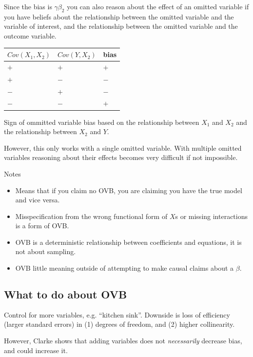 \documentclass{tufte-handout}
\begin{document}
Since the bias is \(\gamma \beta_2\) you can also reason about the
effect of an omitted variable if you have beliefs about the relationship
between the omitted variable and the variable of interest, and the
relationship between the omitted variable and the outcome variable.

\begin{marginfigure}
\begin{tabular}{lll}
 $Cov(X_1, X_2)$ & $Cov(Y, X_2)$ & bias \\
\hline
 $+$      & $+$       & $+$  \\
 $+$      & $-$       & $-$  \\
 $-$      & $+$       & $-$  \\
 $-$      & $-$       & $+$  
\end{tabular}
\caption{Sign of ommitted variable bias based on the relationship
between $X_1$ and $X_2$ and the relationship between $X_2$ and $Y$.}
\end{marginfigure}

However, this only works with a single omitted variable. With multiple
omitted variables reasoning about their effects becomes very difficult
if not impossible.

Notes

\begin{itemize}
\itemsep1pt\parskip0pt
\item
  Means that if you claim no OVB, you are claiming you have the true
  model and vice versa.
\item
  Misspecification from the wrong functional form of \(X\)s or missing
  interactions is a form of OVB.
\item
  OVB is a deterministic relationship between coefficients and
  equations, it is not about sampling.
\item
  OVB little meaning outside of attempting to make causal claims about a
  \(\beta\).
\end{itemize}

\subsection{What to do about OVB}\label{what-to-do-about-ovb}

Control for more variables, e.g. ``kitchen sink''. Downside is loss of
efficiency (larger standard errors) in (1) degrees of freedom, and (2)
higher collinearity.

However, Clarke shows that adding variables does not \emph{necessarily}
decrease bias, and could increase it.
\end{document}

